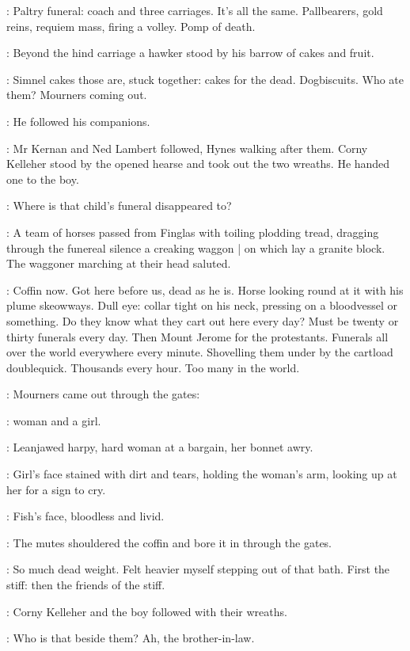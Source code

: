\BloomInt:
Paltry funeral:
coach and three carriages.
It's all the same.
Pallbearers, gold reins, requiem mass, firing a volley.
Pomp of death.

:
Beyond the hind carriage
a hawker stood by his barrow of cakes and fruit.

\BloomInt:
Simnel cakes those are, stuck together:
cakes for the dead.
Dogbiscuits.
Who ate them?
Mourners coming out.

:
He followed his companions.

:
Mr Kernan and Ned Lambert followed,
Hynes walking after them.
Corny Kelleher stood by the opened hearse and took out the two wreaths.
He handed one to the boy.

\BloomInt:
Where is that child's funeral disappeared to?

:
A team of horses passed from Finglas with toiling plodding tread,
dragging through the funereal silence a creaking waggon |
on which lay a granite block.
The waggoner marching at their head saluted.

\BloomInt:
Coffin now.
Got here before us, dead as he is.
Horse looking round at it with his plume skeowways.
Dull eye:
collar tight on his neck,
pressing on a bloodvessel or something.
Do they know what they cart out here every day?
Must be twenty or thirty funerals every day.
Then Mount Jerome for the protestants.
Funerals all over the world
everywhere every minute.
Shovelling them under by the cartload doublequick.
Thousands every hour.
Too many in the world.

:
Mourners came out through the gates:

\BloomInt:
woman and a girl.

\BloomInt:
Leanjawed harpy, hard woman at a bargain, her bonnet awry.

\BloomInt:
Girl's face stained with dirt and tears,
holding the woman's arm, looking up at her for a sign to cry.

\BloomInt:
Fish's face,
bloodless and livid.

:
The mutes shouldered the coffin and bore it in through the gates.

\BloomInt:
So much dead weight.
Felt heavier myself stepping out of that bath.
First the stiff:
then the friends of the stiff.

:
Corny Kelleher and the boy followed with their wreaths.

\BloomInt:
Who is that beside them?
Ah, the brother-in-law.

